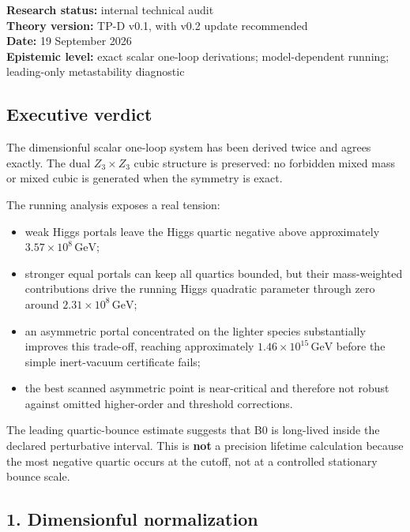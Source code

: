 \documentclass[
]{article}
\providecommand{\tightlist}{%
  \setlength{\itemsep}{0pt}\setlength{\parskip}{0pt}}
\begin{document}
\textbf{Research status:} internal technical audit\\
\textbf{Theory version:} TP-D v0.1, with v0.2 update recommended\\
\textbf{Date:} 19 September 2026\\
\textbf{Epistemic level:} exact scalar one-loop derivations;
model-dependent running; leading-only metastability diagnostic

\hypertarget{executive-verdict-2}{%
\subsection{Executive verdict}\label{executive-verdict-2}}

The dimensionful scalar one-loop system has been derived twice and
agrees exactly. The dual \(Z_3\times Z_3\) cubic structure is preserved:
no forbidden mixed mass or mixed cubic is generated when the symmetry is
exact.

The running analysis exposes a real tension:

\begin{itemize}
\tightlist
\item
  weak Higgs portals leave the Higgs quartic negative above
  approximately \(3.57\times10^8\,\mathrm{GeV}\);
\item
  stronger equal portals can keep all quartics bounded, but their
  mass-weighted contributions drive the running Higgs quadratic
  parameter through zero around \(2.31\times10^8\,\mathrm{GeV}\);
\item
  an asymmetric portal concentrated on the lighter species substantially
  improves this trade-off, reaching approximately
  \(1.46\times10^{15}\,\mathrm{GeV}\) before the simple inert-vacuum
  certificate fails;
\item
  the best scanned asymmetric point is near-critical and therefore not
  robust against omitted higher-order and threshold corrections.
\end{itemize}

The leading quartic-bounce estimate suggests that B0 is long-lived
inside the declared perturbative interval. This is \textbf{not} a
precision lifetime calculation because the most negative quartic occurs
at the cutoff, not at a controlled stationary bounce scale.

\hypertarget{dimensionful-normalization}{%
\subsection{1. Dimensionful
normalization}\label{dimensionful-normalization}}
\end{document}
